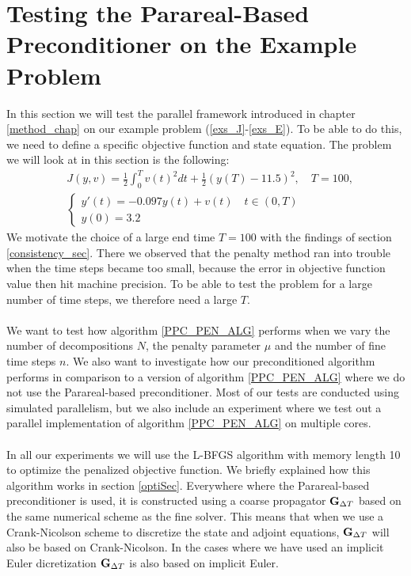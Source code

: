 \section{Testing the Parareal-Based Preconditioner on the Example Problem}
In this section we will test the parallel framework introduced in chapter \ref{method_chap} on our example problem (\ref{exs_J}-\ref{exs_E}). To be able to do this, we need to define a specific objective function and state equation. The problem we will look at in this section is the following:
\begin{align}
&J(y,v) = \frac{1}{2}\int_0^{T}v(t)^2dt + \frac{1}{2}(y(T)-11.5)^2,\quad T=100, \label{speed_j}\\
&\left\{
     \begin{array}{lr}
       	y'(t)=-0.097y(t) + v(t) \quad t\in(0,T)\\
       	y(0)=3.2
     \end{array}
   \right. \label{speed_e}
\end{align}
We motivate the choice of a large end time $T=100$ with the findings of section \ref{consistency_sec}. There we observed that the penalty method ran into trouble when the time steps became too small, because the error in objective function value then hit machine precision. To be able to test the problem for a large number of time steps, we therefore need a large $T$.
\\
\\
We want to test how algorithm \ref{PPC_PEN_ALG} performs when we vary the number of decompositions $N$, the penalty parameter $\mu$ and the number of fine time steps $n$. We also want to investigate how our preconditioned algorithm performs in comparison to a version of algorithm \ref{PPC_PEN_ALG} where we do not use the Parareal-based preconditioner. Most of our tests are conducted using simulated parallelism, but we also include an experiment where we test out a parallel implementation of algorithm \ref{PPC_PEN_ALG} on multiple cores.
\\
\\
In all our experiments we will use the L-BFGS algorithm\cite{nocedal1980updating} with memory length 10 to optimize the penalized objective function. We briefly explained how this algorithm works in section \ref{optiSec}. Everywhere where the Parareal-based preconditioner is used, it is constructed using a coarse propagator $\bold G_{\Delta T}$ based on the same numerical scheme as the fine solver. This means that when we use a Crank-Nicolson scheme to discretize the state and adjoint equations, $\bold G_{\Delta T}$ will also be based on Crank-Nicolson. In the cases where we have used an implicit Euler dicretization $\bold G_{\Delta T}$ is also based on implicit Euler.
